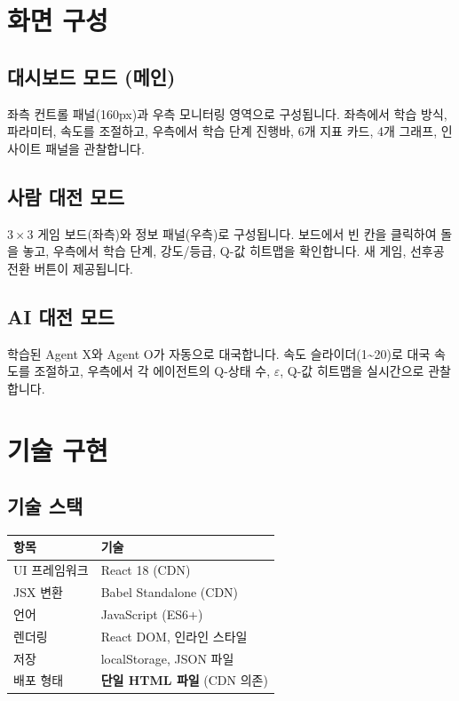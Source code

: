 \documentclass[11pt,a4paper]{article}
\begin{document}
\section{화면 구성}

\subsection{대시보드 모드 (메인)}

좌측 컨트롤 패널(160px)과 우측 모니터링 영역으로 구성됩니다. 좌측에서 학습 방식, 파라미터, 속도를 조절하고, 우측에서 학습 단계 진행바, 6개 지표 카드, 4개 그래프, 인사이트 패널을 관찰합니다.

\subsection{사람 대전 모드}

$3\times3$ 게임 보드(좌측)와 정보 패널(우측)로 구성됩니다. 보드에서 빈 칸을 클릭하여 돌을 놓고, 우측에서 학습 단계, 강도/등급, Q-값 히트맵을 확인합니다.  새 게임,  선후공 전환 버튼이 제공됩니다.

\subsection{AI 대전 모드}

학습된 Agent X와 Agent O가 자동으로 대국합니다. 속도 슬라이더(1\textasciitilde20)로 대국 속도를 조절하고, 우측에서 각 에이전트의 Q-상태 수, $\varepsilon$, Q-값 히트맵을 실시간으로 관찰합니다.

\section{기술 구현}

\subsection{기술 스택}

\begin{center}
\renewcommand{\arraystretch}{1.4}
\begin{tabular}{|l|l|}
\hline
\rowcolor{tableheader}
\textbf{항목} & \textbf{기술} \\
\hline
UI 프레임워크 & React 18 (CDN) \\
\hline
JSX 변환 & Babel Standalone (CDN) \\
\hline
언어 & JavaScript (ES6+) \\
\hline
렌더링 & React DOM, 인라인 스타일 \\
\hline
저장 & localStorage, JSON 파일 \\
\hline
배포 형태 & \textbf{단일 HTML 파일} (CDN 의존) \\
\hline
\end{tabular}
\end{center}
\end{document}
